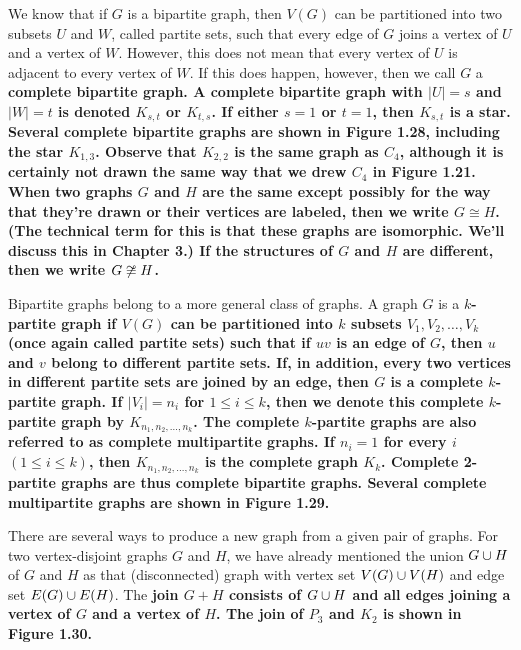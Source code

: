 We know that if $G$ is a bipartite graph, then $V(G)$ can be partitioned into two subsets $U$ and $W$, called partite sets, such that every edge of $G$ joins a vertex of $U$ and a vertex of $W$. However, this does not mean that every vertex of $U$ is adjacent to every vertex of $W$. If this does happen, however, then we call $G$ a \bf{complete bipartite graph}. A complete bipartite graph with $|U| = s$ and $|W| = t$ is denoted $K_{s,t}$ or $K_{t,s}$. If either $s=1$ or $t=1$, then $K_{s,t}$ is a \bf{star}. Several complete bipartite graphs are shown in Figure 1.28, including the star $K_{1,3}$. Observe that $K_{2,2}$ is the same graph as $C_{4}$, although it is certainly not drawn the same way that we drew $C_{4}$ in Figure 1.21. When two graphs $G$ and $H$ are the same except possibly for the way that they're drawn or their vertices are labeled, then we write $G \cong H$. (The technical term for this is that these graphs are isomorphic. We'll discuss this in Chapter 3.) If the structures of $G$ and $H$ are different, then we write $G \centernot\cong H$.



Bipartite graphs belong to a more general class of graphs. A graph $G$ is a $k$\bf{-partite graph} if $V(G)$ can be partitioned into $k$ subsets $V_{1},V_{2},\ldots,V_{k}$ (once again called \bf{partite sets}) such that if $uv$ is an edge of $G$, then $u$ and $v$ belong to different partite sets. If, in addition, every two vertices in different partite sets are joined by an edge, then $G$ is a \bf{complete} $k$\bf{-partite graph}. If $|V_{i}| = n_{i}$ for $1 \leq i \leq k$, then we denote this complete $k$-partite graph by $K_{n_{1},n_{2},\ldots,n_{k}}$. The complete $k$-partite graphs are also referred to as \bf{complete multipartite graphs}. If $n_{i}=1$ for every $i$ $(1 \leq i \leq k)$, then $K_{n_{1},n_{2},\ldots,n_{k}}$ is the complete graph $K_{k}$. Complete 2-partite graphs are thus complete bipartite graphs. Several complete multipartite graphs are shown in Figure 1.29.



There are several ways to produce a new graph from a given pair of graphs. For two vertex-disjoint graphs $G$ and $H$, we have already mentioned the union $G \cup H$ of $G$ and $H$ as that (disconnected) graph with vertex set $V(G) \cup V(H)$ and edge set $E(G) \cup E(H)$. The \bf{join} $G+H$ consists of $G \cup H$ and all edges joining a vertex of $G$ and a vertex of $H$. The join of $P_{3}$ and $K_{2}$ is shown in Figure 1.30.

